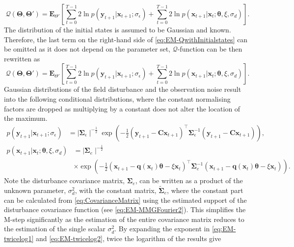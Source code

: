 \documentclass[]{article}
\begin{document}
\begin{equation}\label{eq:QIntermsofJointDist}
\mathcal Q(\boldsymbol \Theta,\boldsymbol\Theta')=\mathbf E_{\Theta'}\left[\sum_{t=0}^{T-1}2\ln p(\mathbf y_{t+1}|\mathbf x_{t+1}; \sigma_{\epsilon})+\sum_{t=0}^{T-1}2\ln p(\mathbf x_{t+1}|\mathbf x_{t};\boldsymbol \theta, \xi ,\sigma_d)\right].
\end{equation}
The distribution of the initial states is assumed to be Gaussian and known. Therefore, the last term on the right-hand side of \eqref{eq:EM-QwithInitialstates} can be omitted as it does not depend on the parameter set, $\mathcal Q$-function can be then rewritten as
\begin{equation}\label{eq:QIntermsofJointDist}
\mathcal Q(\boldsymbol \Theta,\boldsymbol\Theta')=\mathbf E_{\Theta'}\left[\sum_{t=0}^{T-1}2\ln p(\mathbf y_{t+1}|\mathbf x_{t+1}; \sigma_{\epsilon})+\sum_{t=0}^{T-1}2\ln p(\mathbf x_{t+1}|\mathbf x_{t};\boldsymbol \theta, \xi ,\sigma_d)\right].
\end{equation}
Gaussian distributions of the field disturbance and the observation noise result into the following conditional distributions, where the constant normalising factors are dropped as multiplying by a constant does not alter the location of the maximum.
\begin{align}\label{eq:EM-twicelog1}
 p\left(\mathbf y_{t+1}|\mathbf x_{t+1};\sigma_{\epsilon}\right)&= \mid\boldsymbol\Sigma_{\epsilon}\mid^{-\frac{1}{2}}  \exp\left({-\frac{1}{2}\left(\mathbf y_{t+1}-\mathbf C\mathbf  x_{t+1}\right)^\top\boldsymbol\Sigma_{\epsilon}^{-1}\left(\mathbf y_{t+1}-\mathbf C\mathbf  x_{t+1}\right)}\right),
\end{align}
\begin{align}\label{eq:EM-twicelog2}
p(\mathbf x_{t+1}|\mathbf x_{t};\boldsymbol \theta , \xi, \sigma_d)&= \mid\boldsymbol\Sigma_{e}\mid^{-\frac{1}{2}} \nonumber \\
&\times\exp \left(-\frac{1}{2}(\mathbf x_{t+1}-\mathbf q(\mathbf  x_t)\boldsymbol\theta-\xi  \mathbf x_t)^\top\boldsymbol\Sigma_e^{-1}(\mathbf x_{t+1}-\mathbf q( \mathbf x_t)\boldsymbol\theta-\xi \mathbf  x_t) \right).
\end{align}
Note the disturbance covariance matrix, $\boldsymbol\Sigma_e$, can be written as a product of the unknown parameter, $\sigma_d^2$, with the constant matrix, $\tilde{\boldsymbol\Sigma}_e$, where the constant part can be calculated from \eqref{eq:CovarianceMatrix} using the estimated support of the disturbance covariance function (see \eqref{eq:EM-MMGFourier2}). This simplifies the M-step significantly as the estimation of the entire covariance matrix  reduces to the estimation of the single scalar  $\sigma_d^2$. By expanding the exponent in \eqref{eq:EM-twicelog1} and \eqref{eq:EM-twicelog2}, twice the logarithm of the results give
\end{document}
